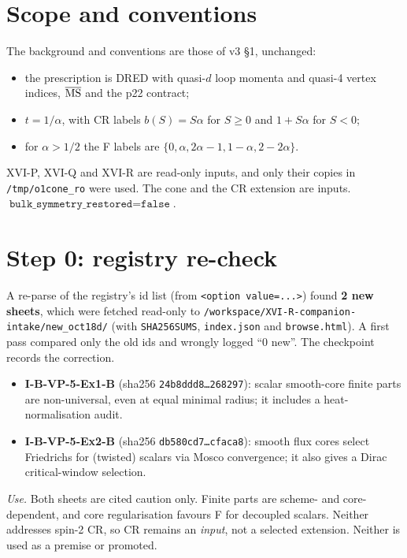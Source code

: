 \documentclass[11pt]{article}
\theoremstyle{definition}
\begin{document}
\section{Scope and conventions}
The background and conventions are those of v3 \S1, unchanged:
\begin{itemize}
\item the prescription is DRED with quasi-$d$ loop momenta and quasi-4 vertex indices, $\overline{\rm MS}$ and the p22 contract;
\item $t=1/\alpha$, with CR labels $b(S)=S\alpha$ for $S\ge0$ and $1+S\alpha$ for $S<0$;
\item for $\alpha>1/2$ the F labels are $\{0,\alpha,2\alpha-1,1-\alpha,2-2\alpha\}$.
\end{itemize}
XVI-P, XVI-Q and XVI-R are read-only inputs, and only their copies in \texttt{/tmp/o1cone\_ro} were used. The cone and the CR extension are inputs. $\texttt{bulk\_symmetry\_restored}=\texttt{false}$.

\section{Step 0: registry re-check}\label{sec:intake}
A re-parse of the registry's id list (from \texttt{<option value=...>}) found \textbf{2 new sheets}, which were fetched read-only to \texttt{/workspace/XVI-R-companion-intake/new\_oct18d/} (with \texttt{SHA256SUMS}, \texttt{index.json} and \texttt{browse.html}). A first pass compared only the old ids and wrongly logged ``0 new''. The checkpoint records the correction.
\begin{itemize}
\item \textbf{I-B-VP-5-Ex1-B} (sha256 \texttt{24b8ddd8\dots 268297}): scalar smooth-core finite parts are non-universal, even at equal minimal radius; it includes a heat-normalisation audit.
\item \textbf{I-B-VP-5-Ex2-B} (sha256 \texttt{db580cd7\dots cfaca8}): smooth flux cores select Friedrichs for (twisted) scalars via Mosco convergence; it also gives a Dirac critical-window selection.
\end{itemize}
\emph{Use.} Both sheets are cited caution only. Finite parts are scheme- and core-dependent, and core regularisation favours F for decoupled scalars. Neither addresses spin-2 CR, so CR remains an \emph{input}, not a selected extension. Neither is used as a premise or promoted.
\end{document}
